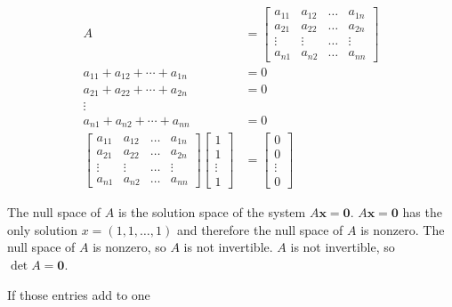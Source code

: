 \documentclass[main.tex]{subfiles}
\begin{document}
\begin{enumerate}
    $$
    \begin{aligned}
    A&=\left[\begin{array}{cccc}
    a_{11} & a_{12} & \ldots & a_{1 n} \\
    a_{21} & a_{22} & \ldots & a_{2 n} \\
    \vdots & \vdots & \ldots & \vdots \\
    a_{n 1} & a_{n 2} & \ldots & a_{n n}
    \end{array}\right]\\
    a_{11}+a_{12}+\cdots+a_{1 n}&=0 \\
    a_{21}+a_{22}+\cdots+a_{2 n}&=0 \\
    \vdots & \\
    a_{n 1}+a_{n 2}+\cdots+a_{n n}&=0\\
    \left[\begin{array}{cccc}
    a_{11} & a_{12} & \ldots & a_{1 n} \\
    a_{21} & a_{22} & \ldots & a_{2 n} \\
    \vdots & \vdots & \ldots & \vdots \\
    a_{n 1} & a_{n 2} & \ldots & a_{n n}
    \end{array}\right]\left[\begin{array}{c}
    1 \\
    1 \\
    \vdots \\
    1
    \end{array}\right]&=\left[\begin{array}{c}
    0 \\
    0 \\
    \vdots \\
    0
    \end{array}\right]
    \end{aligned}
    $$
    
    The null space of $A$ is the solution space of the system $A \bm{x}=\bm{0}$. $A \bm{x}=\bm{0}$ has the only solution $x=(1,1, \ldots, 1)$ and therefore the null space of $A$ is nonzero. The null space of $A$ is nonzero, so $A$ is not invertible. $A$ is not invertible, so $\operatorname{det} A=\bm{0}$. 
    
    If those entries add to one
    

\end{enumerate}
\end{document}
